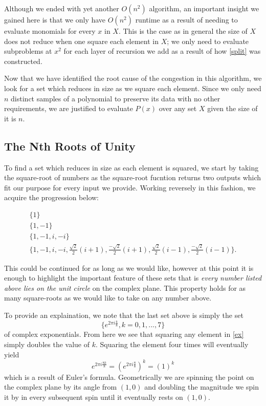 \documentclass[../article.tex]{subfiles}
\begin{document}
Although we ended with yet another $O(n^2)$ algorithm, an important insight we gained here is that we only have $O(n^2)$ runtime as a result of needing to evaluate monomials for every $x$ in $X$. This is the case as in general the size of $X$ does not reduce when one square each element in $X$; we only need to evaluate subproblems at $x^2$ for each layer of recursion we add as a result of how \eqref{split} was constructed.

Now that we have identified the root cause of the congestion in this algorithm, we look for a set which reduces in size as we square each element. Since we only need $n$ distinct samples of a polynomial to preserve its data with no other requirements, we are justified to evaluate $P(x)$ over any set $X$ given the size of it is $n$.

\subsection{The Nth Roots of Unity}

To find a set which reduces in size as each element is squared, we start by taking the square-root of numbers as the square-root fucntion returns two outputs which fit our purpose for every input we provide. Working reversely in this fashion, we acquire the progression below:

\begin{eqnarray*}
&\{1\}&\\
&\{1,-1\}&\\
&\{1,-1,i,-i\}&\\
&\{1,-1,i,-i,\frac{\sqrt{2}}{2}(i+1), \frac{-\sqrt{2}}{2}(i+1), \frac{\sqrt{2}}{2}(i-1), \frac{-\sqrt{2}}{2}(i-1)\}.&
\end{eqnarray*}

This could be continued for as long as we would like, however at this point it is enough to highlight the important feature of these sets that is \emph{every number listed above lies on the unit circle} on the complex plane. This property holds for as many square-roots as we would like to take on any number above.

To provide an explaination, we note that the last set above is simply the set
\begin{equation} \label{ex}
\{e^{2\pi i\frac{k}{8}}, k = 0,1,...,7\}
\end{equation}
of complex exponentials. From here we see that squaring any element in \eqref{ex} simply doubles the value of $k$. Squaring the element four times will eventually yield
\begin{equation*}
e^{2\pi i\frac{8k}{8}} = (e^{2\pi i\frac{8}{8}})^k = (1)^k
\end{equation*}
which is a result of Euler's formula. Geometrically we are spinning the point on the complex plane by its angle from $(1,0)$ and doubling the magnitude we spin it by in every subsequent spin until it eventually rests on $(1,0)$.
\end{document}
